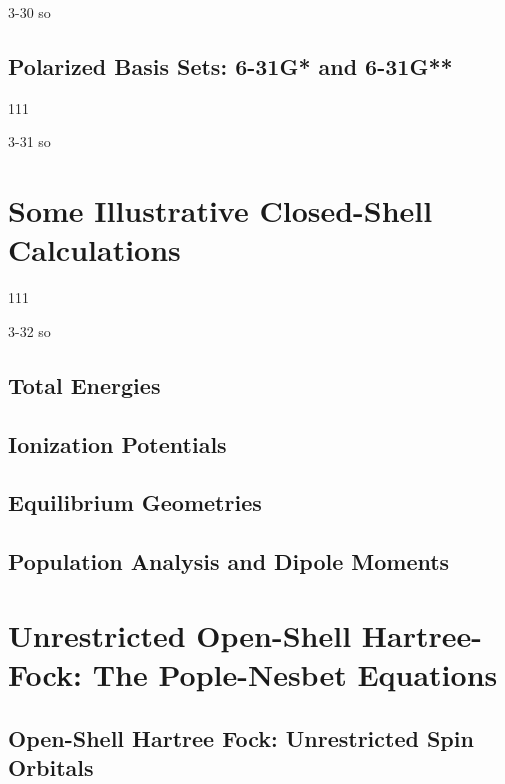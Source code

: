 \documentclass[a4paper]{book}
\begin{document}
	\begin{solution}
		3-30 so
	\end{solution}
	
	\subsection{Polarized Basis Sets: 6-31G* and 6-31G**}
	
	\begin{exercise}
	111
	\end{exercise}
	
	\begin{solution}
		3-31 so
	\end{solution}
	
	\section{Some Illustrative Closed-Shell Calculations}
	
	\begin{exercise}
	111
	\end{exercise}
	
	\begin{solution}
		3-32 so
	\end{solution}
	
	\subsection{Total Energies}
	
	\subsection{Ionization Potentials}
	
	\subsection{Equilibrium Geometries}
	
	\subsection{Population Analysis and Dipole Moments}
	
	\section{Unrestricted Open-Shell Hartree-Fock: The Pople-Nesbet Equations}
	
	\subsection{Open-Shell Hartree Fock: Unrestricted Spin Orbitals}
	
\end{document}
